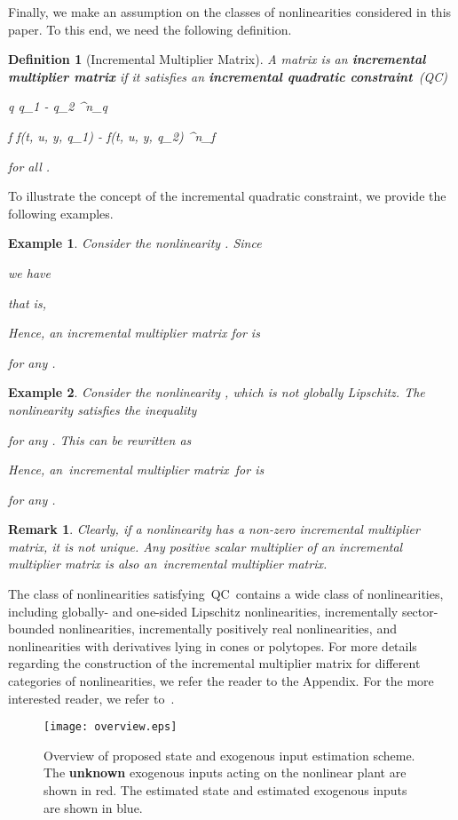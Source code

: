 \documentclass[times, doublespace]{rncauth}
\newcommand{\iqc}{QC}
\newtheorem{example}{Example}
\newtheorem{definition}{Definition}
\newtheorem{remark}{Remark}
\begin{document}
Finally, we make an assumption on the classes of nonlinearities considered in this paper. To this end, we need the following definition.
\begin{definition}[Incremental Multiplier Matrix]
A matrix  is an \textbf{incremental multiplier matrix} if it satisfies an \textbf{incremental quadratic constraint}~(\iqc)
	
	
		\delta q \triangleq q_1 - q_2 \in{}^{n_q}
		
		\delta f \triangleq f(t, u, y, q_1) - f(t, u, y, q_2) \in{}^{n_f}
		
	for all .
\end{definition}
To illustrate the concept of the incremental quadratic constraint, we provide the following examples.
\begin{example}
Consider the nonlinearity . Since

we have 

that is,

Hence, an incremental multiplier matrix for  is

for any .
\end{example}
\begin{example}
Consider the nonlinearity , which is not globally Lipschitz. The nonlinearity  satisfies the inequality

for any . This 
can be rewritten as

  Hence, an~incremental multiplier matrix~for  is 

for any .
\end{example}
\begin{remark}
Clearly, if a nonlinearity has a non-zero  incremental multiplier matrix, it  is not unique.
Any positive scalar multiplier of an incremental multiplier matrix is also an~incremental multiplier matrix.
\end{remark}
The class of nonlinearities satisfying~\iqc~contains a wide class of nonlinearities, including globally- and one-sided Lipschitz nonlinearities, incrementally sector-bounded nonlinearities, incrementally positively real nonlinearities, and nonlinearities with derivatives lying in cones or polytopes. For more details regarding the construction of the incremental multiplier matrix for different categories of nonlinearities, we refer the reader to the Appendix. For the more interested reader, we refer to~\cite{iqs_corless,acikmese11obs}.
\begin{figure}[!ht]
	\centering
	\texttt{[image: overview.eps]}
	\caption{Overview of proposed state and exogenous input estimation scheme. The \textbf{unknown} exogenous inputs  acting on the nonlinear plant are shown in red. The estimated state  and estimated exogenous inputs  are shown in blue.}
	\label{fig:overview}
\end{figure}
\end{document}
